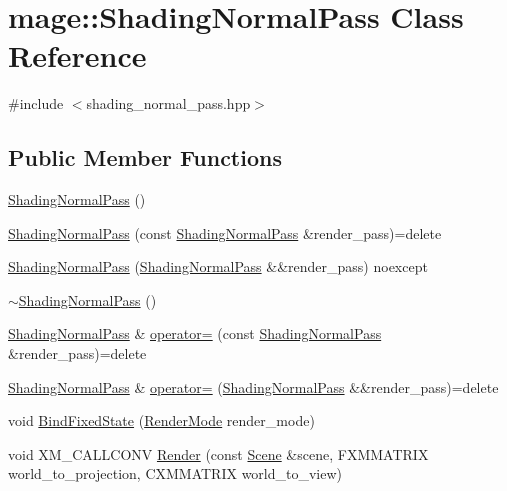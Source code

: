 \hypertarget{classmage_1_1_shading_normal_pass}{}\section{mage\+:\+:Shading\+Normal\+Pass Class Reference}
\label{classmage_1_1_shading_normal_pass}


{\ttfamily \#include $<$shading\+\_\+normal\+\_\+pass.\+hpp$>$}

\subsection*{Public Member Functions}
\begin{DoxyCompactItemize}
\item 
\hyperlink{classmage_1_1_shading_normal_pass_a8d85834472875ce27cf3966b7c561d1f}{Shading\+Normal\+Pass} ()
\item 
\hyperlink{classmage_1_1_shading_normal_pass_ab13b45f9a3118f8494150d64ff06f94f}{Shading\+Normal\+Pass} (const \hyperlink{classmage_1_1_shading_normal_pass}{Shading\+Normal\+Pass} \&render\+\_\+pass)=delete
\item 
\hyperlink{classmage_1_1_shading_normal_pass_ab5d2c287dd28b0161a0b267373e264ff}{Shading\+Normal\+Pass} (\hyperlink{classmage_1_1_shading_normal_pass}{Shading\+Normal\+Pass} \&\&render\+\_\+pass) noexcept
\item 
\hyperlink{classmage_1_1_shading_normal_pass_aba7194077210d32dbcbc6cfbf4adba8f}{$\sim$\+Shading\+Normal\+Pass} ()
\item 
\hyperlink{classmage_1_1_shading_normal_pass}{Shading\+Normal\+Pass} \& \hyperlink{classmage_1_1_shading_normal_pass_afef400a6e3b00a43f6b6d3a3f34d43b7}{operator=} (const \hyperlink{classmage_1_1_shading_normal_pass}{Shading\+Normal\+Pass} \&render\+\_\+pass)=delete
\item 
\hyperlink{classmage_1_1_shading_normal_pass}{Shading\+Normal\+Pass} \& \hyperlink{classmage_1_1_shading_normal_pass_a25a9ba6a32a246176929f4de1a4adf0c}{operator=} (\hyperlink{classmage_1_1_shading_normal_pass}{Shading\+Normal\+Pass} \&\&render\+\_\+pass)=delete
\item 
void \hyperlink{classmage_1_1_shading_normal_pass_a49c57b6c8a6aee0678556f25f9c97d11}{Bind\+Fixed\+State} (\hyperlink{namespacemage_a5e7e18b0154373ce8fc942fe3f6b27fd}{Render\+Mode} render\+\_\+mode)
\item 
void X\+M\+\_\+\+C\+A\+L\+L\+C\+O\+NV \hyperlink{classmage_1_1_shading_normal_pass_a21f09077193e7b1dd50cd0968a66b6a6}{Render} (const \hyperlink{classmage_1_1_scene}{Scene} \&scene, F\+X\+M\+M\+A\+T\+R\+IX world\+\_\+to\+\_\+projection, C\+X\+M\+M\+A\+T\+R\+IX world\+\_\+to\+\_\+view)
\end{DoxyCompactItemize}
